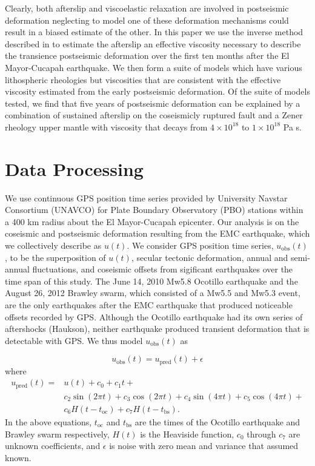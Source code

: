 \documentclass[12pt]{article}
\begin{document}
Clearly, both afterslip and viscoelastic relaxation are involved in postseismic deformation neglecting to model one of these deformation mechanisms could result in a biased estimate of the other.  In this paper we use the inverse method described in \cite{Hines2015} to estimate the afterslip an effective viscosity necessary to describe the transience postseismic deformation over the first ten months after the El Mayor-Cucapah earthquake. We then form a suite of models which have various lithospheric rheologies but viscosities that are consistent with the effective viscosity estimated from the early postseismic deformation. Of the suite of models tested, we find that five years of postseismic deformation can be explained by a combination of sustained afterslip on the coseismicly ruptured fault and a Zener rheology upper mantle with viscosity that decays from $4\times10^{18}$ to $1\times10^{18}$ Pa s. 


\section*{Data Processing}

We use continuous GPS position time series provided by University Navstar Consortium (UNAVCO) for Plate Boundary Observatory (PBO) stations within a 400 km radius about the El Mayor-Cucapah epicenter. Our analysis is on the coseismic and postseismic deformation resulting from the EMC earthquake, which we collectively describe as $u(t)$. We consider GPS position time series, $u_\mathrm{obs}(t)$, to be the superposition of $u(t)$, secular tectonic deformation, annual and semi-annual fluctuations, and coseismic offsets from sigificant earthquakes over the time span of this study.  The June 14, 2010 Mw5.8 Ocotillo earthquake and the August 26, 2012 Brawley swarm, which consisted of a Mw5.5 and Mw5.3 event, are the only earthquakes after the EMC earthquake that produced noticeable offsets recorded by GPS. Although the Ocotillo earthquake had its own series of aftershocks (Haukson), neither earthquake produced transient deformation that is detectable with GPS. We thus model $u_\mathrm{obs}(t)$ as 

\begin{equation}
  u_\mathrm{obs}(t) = u_\mathrm{pred}(t) + \epsilon
\end{equation}
where
\begin{equation}\label{TimeSeriesModel}
  \begin{split}  
    u_\mathrm{pred}(t) = &u(t) + c_0 + c_1t + \\
                         &c_2\sin(2\pi t) + c_3\cos(2\pi t) + c_4\sin(4\pi t) + c_5\cos(4\pi t) + \\
                         &c_6H(t-t_\mathrm{oc}) + c_7H(t-t_\mathrm{bs}).
  \end{split}
\end{equation}
In the above equations, $t_\mathrm{oc}$ and $t_\mathrm{bs}$ are the times of the Ocotillo earthquake and Brawley swarm respectively, $H(t)$ is the Heaviside function, $c_0$ through $c_7$ are unknown coefficients, and $\epsilon$ is noise with zero mean and variance that assumed known.
\end{document}
